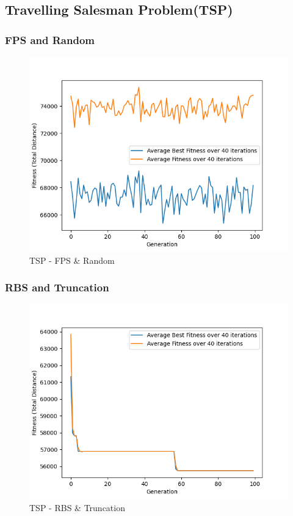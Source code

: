 \documentclass[11pt, letterpaper]{article}
\begin{document}
\subsection{Travelling Salesman Problem(TSP)}
\subsubsection {FPS and Random}
\begin{figure}[H]
    \centering
    \includegraphics[scale = 0.6]{images/tsp_fp_rd.png}
    \caption {TSP - FPS \& Random}
    \label {fig:tpsFR}
\end{figure}
\subsubsection {RBS and Truncation}
\begin{figure}[h]
    \centering
    \includegraphics[scale = 0.6]{images/tsp_rb_tr.png}
    \caption {TSP - RBS \& Truncation}
    \label {fig:tpsBT}
\end{figure}
\end{document}
